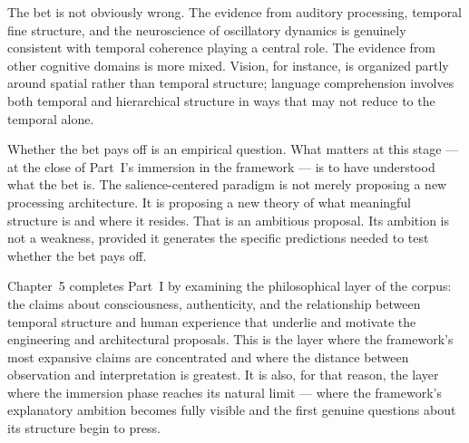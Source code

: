 The bet is not obviously wrong. The evidence from auditory
processing, temporal fine structure, and the neuroscience
of oscillatory dynamics is genuinely consistent with
temporal coherence playing a central role. The evidence
from other cognitive domains is more mixed. Vision, for
instance, is organized partly around spatial rather than
temporal structure; language comprehension involves both
temporal and hierarchical structure in ways that may not
reduce to the temporal alone.

Whether the bet pays off is an empirical question. What
matters at this stage --- at the close of Part~I's immersion
in the framework --- is to have understood what the bet is.
The salience-centered paradigm is not merely proposing
a new processing architecture. It is proposing a new
theory of what meaningful structure is and where it resides.
That is an ambitious proposal. Its ambition is not a weakness,
provided it generates the specific predictions needed to
test whether the bet pays off.

\medskip

Chapter~5 completes Part~I by examining the philosophical
layer of the corpus: the claims about consciousness,
authenticity, and the relationship between temporal structure
and human experience that underlie and motivate the
engineering and architectural proposals. This is the layer
where the framework's most expansive claims are concentrated
and where the distance between observation and interpretation
is greatest. It is also, for that reason, the layer where
the immersion phase reaches its natural limit --- where the
framework's explanatory ambition becomes fully visible and
the first genuine questions about its structure begin to press.

